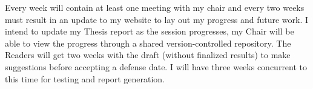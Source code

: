 Every week will contain at least one meeting with my chair and every two weeks
must result in an update to my website to lay out my progress and future work. 
I intend to update my Thesis report as the session progresses, my Chair will be 
able to view the progress through a shared version-controlled repository. The
Readers will get two weeks with the draft (without finalized results) to make
suggestions before accepting a defense date. I will have three weeks concurrent
to this time for testing and report generation.\\



\pagebreak{}

\singlespacing



